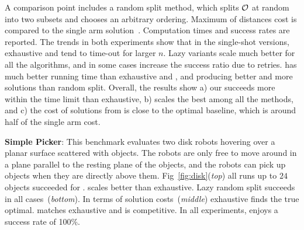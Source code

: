 A comparison point includes a random split method, which splits $ \mathcal{O} $ at random into two subsets and chooses an arbitrary ordering. Maximum of distances cost is compared to the single arm solution~\cite{193}. Computation times and success rates are reported. The trends in both experiments show that in the single-shot versions, exhaustive and \milp tend to time-out for larger $n$. Lazy variants scale much better for all the algorithms, and in some cases increase the success ratio due to retries. \algo has much better running time than exhaustive and \milp, and producing better and more solutions than random split. Overall, the results show a) our \milp succeeds more within the time limit than exhaustive, b) \algo scales the best among all the methods, and c) the cost of solutions from \algo is close to the optimal baseline, which is around half of the single arm cost.

\textbf{Simple Picker}: This benchmark evaluates two disk robots hovering over a planar surface scattered with objects. The robots are only free to move around in a plane parallel to the resting plane of the objects, and the robots can pick up objects when they are directly above them. Fig~\ref{fig:disk}(\textit{top}) all runs up to $ 24 $ objects succeeded for \algo. \milp scales better than exhaustive. Lazy random split succeeds in all cases~(\textit{bottom}). In terms of solution costs~(\textit{middle}) exhaustive finds the true optimal. \milp matches exhaustive and \algo is competitive. In all experiments, \algo enjoys a success rate of 100\%.

